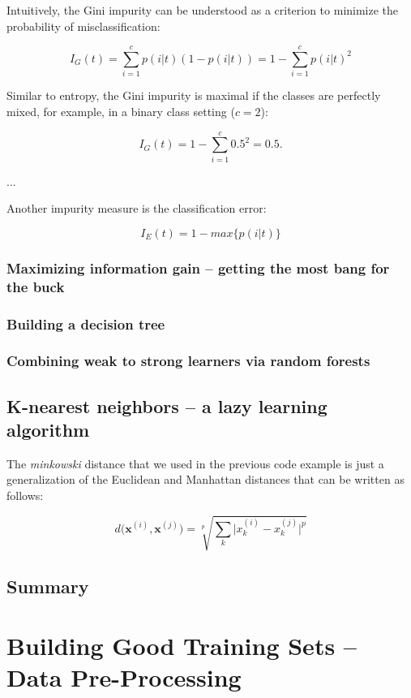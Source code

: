 \documentclass[letterpaper]{report}
\begin{document}
Intuitively, the Gini impurity can be understood as a criterion to minimize the probability of misclassification:

\[
I_G(t) = \sum_{i=1}^{c} p(i | t) (1 - p (i | t)) = 1 - \sum_{i=1}^{c} p(i|t)^2
\]

Similar to entropy, the Gini impurity is maximal if the classes are perfectly mixed, for example, in a binary class setting ($c = 2 $):

\[
I_G(t) = 1 - \sum_{i=1}^{c} 0.5^2 = 0.5.
\]

...

Another impurity measure is the classification error:

\[
I_E(t) = 1 - max \{ p(i|t) \}
\]

\subsection{Maximizing information gain -- getting the most bang for the buck}
\subsection{Building a decision tree}
\subsection{Combining weak to strong learners via random forests}
\section{K-nearest neighbors -- a lazy learning algorithm}

The \textit{minkowski} distance that we used in the previous code example is just a generalization of the Euclidean and Manhattan distances that can be written as follows:

\[
d \big(\mathbf{x}^{(i)}, \mathbf{x}^{(j)}\big) =  \sqrt[p]{\sum_k \big| x_{k}^{(i)} - x_{k}^{(j)} \big|^p } 
\]


\section{Summary}






\chapter{Building Good Training Sets -- Data Pre-Processing}
\end{document}
